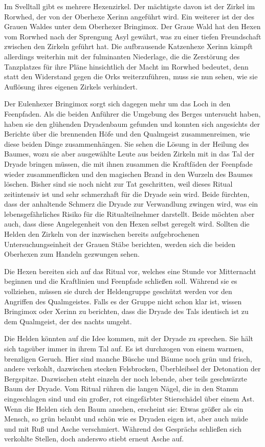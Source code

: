 Im Svelltall gibt es mehrere Hexenzirkel. Der mächtigste davon ist der Zirkel im Rorwhed, der von der Oberhexe Xerinn angeführt wird. Ein weiterer ist der des Grauen Waldes unter dem Oberhexer Bringimox.
Der Graue Wald hat den Hexen vom Rorwhed nach der Sprengung Asyl gewährt, was zu einer tiefen Freundschaft zwischen den Zirkeln geführt hat. Die aufbrausende Katzenhexe Xerinn kämpft allerdings weiterhin mit der fulminanten Niederlage, die die Zerstörung des Tanzplatzes für ihre Pläne hinsichtlich der Macht im Rorwhed bedeutet, denn statt den Widerstand gegen die Orks weiterzuführen, muss sie nun sehen, wie sie Auflösung ihres eigenen Zirkels verhindert.


Der Eulenhexer Bringimox sorgt sich dagegen mehr um das Loch in den Feenpfaden. Als die beiden Anführer die Umgebung des Berges untersucht haben, haben sie den glühenden Dryadenbaum gefunden und konnten sich angesichts der Berichte über die brennenden Höfe und den Qualmgeist zusammenreimen, wie diese beiden Dinge zusammenhängen. Sie sehen die Lösung in der Heilung des Baumes, wozu sie aber ausgewählte Leute aus beiden Zirkeln mit in das Tal der Dryade bringen müssen, die mit ihnen zusammen die Kraftfäden der Feenpfade wieder zusammenflicken und den magischen Brand in den Wurzeln des Baumes löschen. Bisher sind sie noch nicht zur Tat geschritten, weil dieses Ritual zeitintensiv ist und sehr schmerzhaft für die Dryade sein wird. Beide fürchten, dass der anhaltende Schmerz die Dryade zur Verwandlung zwingen wird, was ein lebensgefährliches Risiko für die Ritualteilnehmer darstellt.
Beide möchten aber auch, dass diese Angelegenheit von den Hexen selbst geregelt wird. Sollten die Helden den Zirkeln von der inzwischen bereits aufgebrochenen Untersuchungseinheit der Grauen Stäbe berichten, werden sich die beiden Oberhexen zum Handeln gezwungen sehen.

Die Hexen bereiten sich auf das Ritual vor, welches eine Stunde vor Mitternacht beginnen und die Kraftlinien und Feenpfade schließen soll. Während sie es vollziehen, müssen sie durch der Heldengruppe geschützt werden vor den Angriffen des Qualmgeistes.
Falls es der Gruppe nicht schon klar ist, wissen Bringimox oder Xerinn zu berichten, dass die Dryade des Tals identisch ist zu dem Qualmgeist, der des nachts umgeht.


Die Helden könnten auf die Idee kommen, mit der Dryade zu sprechen. Sie hält sich tagsüber immer in ihrem Tal auf. Es ist durchzogen von einem warmen, brenzligen Geruch. Hier sind manche Büsche und Bäume noch grün und frisch, andere verkohlt, dazwischen stecken Felsbrocken, Überbleibsel der Detonation der Bergspitze. Dazwischen steht einzeln der noch lebende, aber teils geschwärzte Baum der Dryade. Vom Ritual rühren die langen Nägel, die in den Stamm eingeschlagen sind und ein großer, rot eingefärbter Stierschädel über einem Ast.
Wenn die Helden sich den Baum ansehen, erscheint sie: Etwas größer als ein Mensch, so grün belaubt und schön wie es Dryaden eigen ist, aber auch müde und mit Ruß und Asche verschmiert. Während des Gesprächs schließen sich verkohlte Stellen, doch anderswo stiebt erneut Asche auf.


